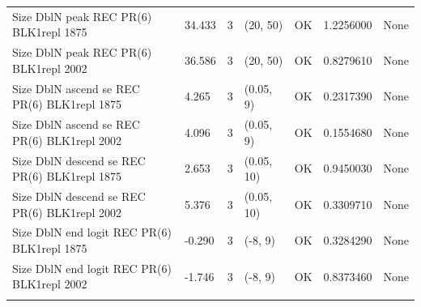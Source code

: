\documentclass[
  english,
  a4paper,
]{article}
\begin{document}
\begin{landscape}
\begin{longtable}[t]{>{\raggedright\arraybackslash}p{8.5cm}lllll>{\raggedright\arraybackslash}p{4cm}}
Size DblN peak REC PR(6) BLK1repl 1875 & 34.433 & 3 & (20, 50) & OK & 1.2256000 & None\\
Size DblN peak REC PR(6) BLK1repl 2002 & 36.586 & 3 & (20, 50) & OK & 0.8279610 & None\\
Size DblN ascend se REC PR(6) BLK1repl 1875 & 4.265 & 3 & (0.05, 9) & OK & 0.2317390 & None\\
Size DblN ascend se REC PR(6) BLK1repl 2002 & 4.096 & 3 & (0.05, 9) & OK & 0.1554680 & None\\
Size DblN descend se REC PR(6) BLK1repl 1875 & 2.653 & 3 & (0.05, 10) & OK & 0.9450030 & None\\
Size DblN descend se REC PR(6) BLK1repl 2002 & 5.376 & 3 & (0.05, 10) & OK & 0.3309710 & None\\
Size DblN end logit REC PR(6) BLK1repl 1875 & -0.290 & 3 & (-8, 9) & OK & 0.3284290 & None\\
Size DblN end logit REC PR(6) BLK1repl 2002 & -1.746 & 3 & (-8, 9) & OK & 0.8373460 & None\\*
\end{longtable}
\endgroup{}
\end{landscape}
\endgroup{}
\end{document}
